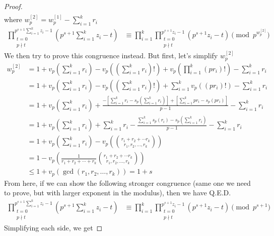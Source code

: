 \documentclass{treatise}
\begin{document}
\begin{proof}
\begin{align*}
\end{align*}
where $w_p^{[2]} = w_p^{[1]} - \sum_{i = 1}^k r_i$
\begin{align*}
\prod_{\substack{t = 0 \\ p \nmid t}}^{p^{s + 1} \sum_{i = 1}^k z_i - 1} \left( p^{s + 1} \sum_{i = 1}^k z_i - t \right) & \equiv \prod_{i = 1}^k \prod_{\substack{t = 0 \\ p \nmid t}}^{p^{s + 1} z_i - 1} (p^{s + 1} z_i - t) \pmod{p^{w_p^{[2]}}}
\end{align*}
We then try to prove this congruence instead. But first, let's simplify $w_p^{[2]}$
\begin{align*}
w_p^{[2]} & = 1 + v_p \left( \sum_{i = 1}^k r_i \right) - v_p \left( \left( \sum_{i = 1}^k r_i \right) ! \right) + v_p \left( \prod_{i = 1}^k (pr_i)! \right) - \sum_{i = 1}^k r_i \\
& = 1 + v_p \left( \sum_{i = 1}^k r_i \right) - v_p \left( \left( \sum_{i = 1}^k r_i \right) ! \right) + \sum_{i = 1}^k v_p \left( (pr_i)! \right) - \sum_{i = 1}^k r_i \\
& = 1 + v_p \left( \sum_{i = 1}^k r_i \right) + \frac{- \left[ \sum_{i = 1}^k r_i - s_p \left( \sum_{i = 1}^k r_i \right) \right] + \left[ \sum_{i = 1}^k pr_i - s_p (pr_i) \right]}{p - 1} - \sum_{i = 1}^k r_i \\
& = 1 + v_p \left( \sum_{i = 1}^k r_i \right) + \sum_{i = 1}^k r_i - \frac{\sum_{i = 1}^k s_p(r_i) - s_p \left( \sum_{i = 1}^k r_i \right)}{p - 1} - \sum_{i = 1}^k r_i \\
& = 1 + v_p \left( \sum_{i = 1}^k r_i \right) - v_p \left( {r_1 + r_2 + \cdots r_k \choose r_1, r_2, \hdots, r_k} \right) \\
& = 1 - v_p \left( \frac{1}{r_1 + r_2 + \cdots + r_k} {r_1 + r_2 + \cdots r_k \choose r_1, r_2, \hdots, r_k} \right) \\
& \leq 1 + v_p (\gcd(r_1, r_2, \hdots, r_k)) = 1 + s
\end{align*}
From here, if we can show the following stronger congruence (same one we need to prove, but with larger exponent in the modulus), then we have Q.E.D.
\begin{align*}
\prod_{\substack{t = 0 \\ p \nmid t}}^{p^{s + 1} \sum_{i = 1}^k z_i - 1} \left( p^{s + 1} \sum_{i = 1}^k z_i - t \right) & \equiv \prod_{i = 1}^k \prod_{\substack{t = 0 \\ p \nmid t}}^{p^{s + 1} z_i - 1} (p^{s + 1} z_i - t) \pmod{p^{s + 1}}
\end{align*}
Simplifying each side, we get

\end{proof}
\end{document}

